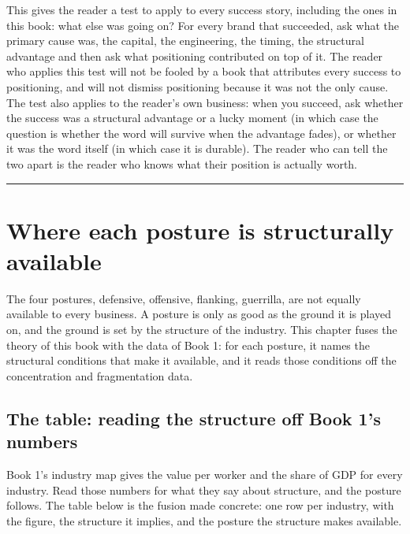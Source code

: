 \documentclass[10pt,twoside,openany]{memoir}
\newcommand{\needspacehead}{\needspace{4\baselineskip}}
\let\oldsection\section
\renewcommand{\section}{\needspacehead\oldsection}
\begin{document}
{This gives the reader a test to apply to every success story, including
the ones in this book: what else was going on? For every brand that
succeeded, ask what the primary cause was, the capital, the engineering,
the timing, the structural advantage and then ask what positioning
contributed on top of it. The reader who applies this test will not be
fooled by a book that attributes every success to positioning, and will
not dismiss positioning because it was not the only cause. The test also
applies to the reader's own business: when you succeed, ask whether the
success was a structural advantage or a lucky moment (in which case the
question is whether the word will survive when the advantage fades), or
whether it was the word itself (in which case it is durable). The reader
who can tell the two apart is the reader who knows what their position
is actually worth.

\begin{center}\rule{0.5\linewidth}{0.5pt}\end{center}

\FloatBarrier
\chapter{Where each posture is structurally
available}\label{where-each-posture-is-structurally-available}

The four postures, defensive, offensive, flanking, guerrilla, are not
equally available to every business. A posture is only as good as the
ground it is played on, and the ground is set by the structure of the
industry. This chapter fuses the theory of this book with the data of
Book 1: for each posture, it names the structural conditions that make
it available, and it reads those conditions off the concentration and
fragmentation data.

\section{The table: reading the structure off Book 1's
numbers}\label{the-table-reading-the-structure-off-book-1s-numbers}

Book 1's industry map gives the value per worker and the share of GDP
for every industry. Read those numbers for what they say about
structure, and the posture follows. The table below is the fusion made
concrete: one row per industry, with the figure, the structure it
implies, and the posture the structure makes available.

}
\end{document}
